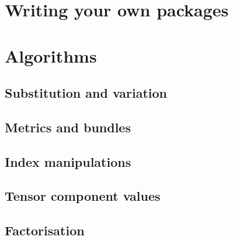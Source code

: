 \documentclass[11pt]{book}
\begin{document}
\chapter{Writing your own packages}






\chapter{Algorithms}

\section{Substitution and variation}









\section{Metrics and bundles}









\section{Index manipulations}











\section{Tensor component values}




\section{Factorisation}



\end{document}
